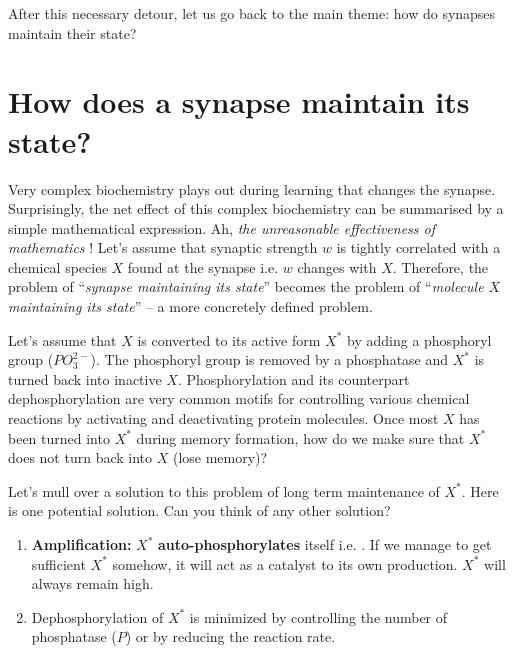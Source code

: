 \documentclass[]{resonance}
\begin{document}
After this necessary detour, let us go back to the main theme: how do synapses
maintain their state?

\section{How does a synapse maintain its state?}

Very complex biochemistry plays out during learning that changes the synapse.
Surprisingly, the net effect of this complex biochemistry can be summarised by a
simple mathematical expression. Ah, \emph{the unreasonable effectiveness of
mathematics} \cite{unreasonable_math}! Let's assume that synaptic strength $w$ is
tightly correlated with a chemical species $X$ found at the synapse i.e. $w$ changes
with $X$. Therefore, the problem of ``\emph{synapse
maintaining its state}'' becomes the problem of ``\emph{molecule $X$ maintaining
its state}'' -- a more concretely defined problem.

Let's assume that $X$ is converted to its active form $X^*$  by adding a
phosphoryl group ($PO_3^{2-}$). The phosphoryl group is removed by a phosphatase
and $X^*$ is turned back into inactive $X$. Phosphorylation and its
counterpart dephosphorylation are very common motifs for controlling various
chemical reactions by activating and deactivating protein molecules. Once most
$X$ has been turned into $X^*$ during memory formation, how do we make sure that
$X^*$ does not turn back into $X$ (lose memory)?

Let's mull over a solution to this problem of long term maintenance of $X^*$.
Here is one potential solution. Can you think of any other solution?

\begin{enumerate}
    \item \textbf{Amplification:} $X^*$ \textbf{auto-phosphorylates} itself i.e. . If we manage to get sufficient $X^*$ somehow, it
        will act as a catalyst to its own production. $X^*$ will always remain
        high.
    \item Dephosphorylation of $X^*$ is minimized by controlling the number of
        phosphatase ($P$) or by reducing the reaction rate.
\end{enumerate} 
\end{document}

